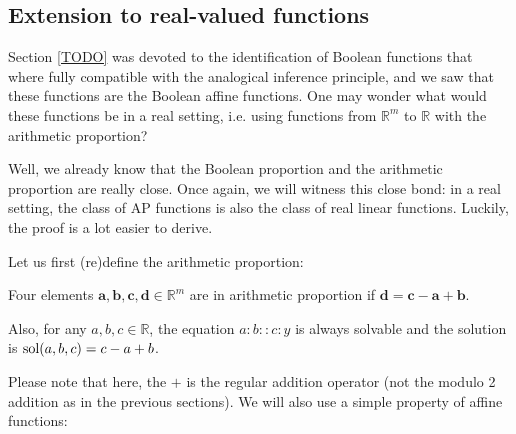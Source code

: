 \subsection{Extension to real-valued functions}

Section \ref{TODO} was devoted to the identification of Boolean functions that
where fully compatible with the analogical inference principle, and we saw that
these functions are the Boolean affine functions. One may wonder what would
these functions be in a real setting, i.e. using functions  from $\mathbb{R}^m$
to $\mathbb{R}$ with the arithmetic proportion?

Well, we already know that the Boolean proportion and the arithmetic proportion
are really close. Once again, we will witness this close bond: in a real
setting, the class of AP functions is also the class of real linear functions.
Luckily, the proof is a lot easier to derive.


Let us first (re)define the arithmetic proportion:
\begin{property}
  \label{PROPER:sol_arithm_prop}
  Four elements $\mathbf{a}, \mathbf{b}, \mathbf{c}, \mathbf{d} \in
  \mathbb{R}^m$ are in arithmetic proportion if $\mathbf{d} = \mathbf{c} -
  \mathbf{a} + \mathbf{b}$.

  Also, for any $a, b, c \in \mathbb{R}$, the equation $a : b :: c:y$ is always
  solvable and the solution is $\text{sol}(a, b, c) = c - a + b$.
\end{property}

Please note that here, the $+$ is the regular addition operator (not the modulo
2 addition as in the previous sections). We will also use a simple property of
affine functions:

